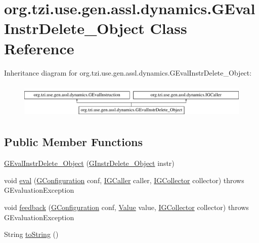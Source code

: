 \hypertarget{classorg_1_1tzi_1_1use_1_1gen_1_1assl_1_1dynamics_1_1_g_eval_instr_delete___object}{\section{org.\-tzi.\-use.\-gen.\-assl.\-dynamics.\-G\-Eval\-Instr\-Delete\-\_\-\-Object Class Reference}
\label{classorg_1_1tzi_1_1use_1_1gen_1_1assl_1_1dynamics_1_1_g_eval_instr_delete___object}
}
Inheritance diagram for org.\-tzi.\-use.\-gen.\-assl.\-dynamics.\-G\-Eval\-Instr\-Delete\-\_\-\-Object\-:\begin{figure}[H]
\begin{center}
\leavevmode
\includegraphics[height=1.702128cm]{classorg_1_1tzi_1_1use_1_1gen_1_1assl_1_1dynamics_1_1_g_eval_instr_delete___object}
\end{center}
\end{figure}
\subsection*{Public Member Functions}
\begin{DoxyCompactItemize}
\item 
\hyperlink{classorg_1_1tzi_1_1use_1_1gen_1_1assl_1_1dynamics_1_1_g_eval_instr_delete___object_a7fa56459a4c5d913d4cfa03b040de103}{G\-Eval\-Instr\-Delete\-\_\-\-Object} (\hyperlink{classorg_1_1tzi_1_1use_1_1gen_1_1assl_1_1statics_1_1_g_instr_delete___object}{G\-Instr\-Delete\-\_\-\-Object} instr)
\item 
void \hyperlink{classorg_1_1tzi_1_1use_1_1gen_1_1assl_1_1dynamics_1_1_g_eval_instr_delete___object_ae947d642b3baeb63f6a3a36514f55aa5}{eval} (\hyperlink{classorg_1_1tzi_1_1use_1_1gen_1_1assl_1_1dynamics_1_1_g_configuration}{G\-Configuration} conf, \hyperlink{interfaceorg_1_1tzi_1_1use_1_1gen_1_1assl_1_1dynamics_1_1_i_g_caller}{I\-G\-Caller} caller, \hyperlink{interfaceorg_1_1tzi_1_1use_1_1gen_1_1assl_1_1dynamics_1_1_i_g_collector}{I\-G\-Collector} collector)  throws G\-Evaluation\-Exception 
\item 
void \hyperlink{classorg_1_1tzi_1_1use_1_1gen_1_1assl_1_1dynamics_1_1_g_eval_instr_delete___object_a51740295b32a43ba419e91f0085e5e5b}{feedback} (\hyperlink{classorg_1_1tzi_1_1use_1_1gen_1_1assl_1_1dynamics_1_1_g_configuration}{G\-Configuration} conf, \hyperlink{classorg_1_1tzi_1_1use_1_1uml_1_1ocl_1_1value_1_1_value}{Value} value, \hyperlink{interfaceorg_1_1tzi_1_1use_1_1gen_1_1assl_1_1dynamics_1_1_i_g_collector}{I\-G\-Collector} collector)  throws G\-Evaluation\-Exception 
\item 
String \hyperlink{classorg_1_1tzi_1_1use_1_1gen_1_1assl_1_1dynamics_1_1_g_eval_instr_delete___object_a5305d55c0db1c4adb849ace8781a5afd}{to\-String} ()
\end{DoxyCompactItemize}
